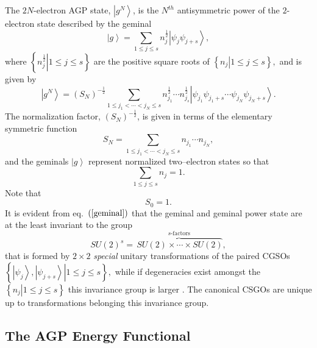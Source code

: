 \documentclass[aps,preprint]{revtex4}%
\begin{document}
\bigskip The $2N$-electron AGP state, $\left\vert g^{N}\right\rangle $, is the
$N^{th}$ antisymmetric power of the $2$-electron state described by the
geminal
\begin{equation}
\left\vert g\right\rangle =\sum_{1\leq j\leq s}n_{j}^{\frac{1}{2}}\left\vert
\psi_{j}\psi_{j+s}\right\rangle , \label{geminal}%
\end{equation}
where $\left\{  \left.  n_{j}^{\frac{1}{2}}\right\vert 1\leq j\leq s\right\}
$ are the positive square roots of $\left\{  \left.  n_{j}\right\vert 1\leq
j\leq s\right\}  ,$ and is given by \cite{Weiner&ortiz04}
\begin{equation}
\left\vert g^{N}\right\rangle =\left(  S_{N}\right)  ^{-\frac{1}{2}}%
\sum_{1\leq j_{1}<\cdots<j_{N}\leq s}n_{j_{1}}^{\frac{1}{2}}\cdots n_{j_{s}%
}^{\frac{1}{2}}\left\vert \psi_{j_{1}}\psi_{j_{1}+s}\cdots\psi_{j_{N}}%
\psi_{j_{N}+s}\right\rangle . \label{agp}%
\end{equation}
The normalization factor, $\left(  S_{N}\right)  ^{-\frac{1}{2}}$, is given in
terms of the elementary symmetric function
\begin{equation}
S_{N}=\sum_{1\leq j_{1}<\cdots<j_{N}\leq s}n_{j_{1}}\cdots n_{j_{N}},
\end{equation}
and the geminals $\left\vert g\right\rangle $ represent normalized
two--electron states so that
\begin{equation}
\sum_{1\leq j\leq s}n_{j}=1.
\end{equation}
Note that
\begin{equation}
S_{0}=1.
\end{equation}
It is evident from eq.\ $\left(  \ref{geminal}\right)  $ that the geminal and
geminal power state are at the least invariant to the group
\begin{equation}
SU\left(  2\right)  ^{s}=\overset{s\text{-factors}}{\overbrace{\,SU\left(
2\right)  \times\cdots\times SU\left(  2\right)  }},
\end{equation}
that is formed by $2\times2$ \emph{special} unitary transformations of the
paired CGSOs $\left\{  \left.  \left\vert \psi_{j}\right\rangle ,\left\vert
\psi_{j+s}\right\rangle \right\vert 1\leq j\leq s\right\}  ,$ while if
degeneracies exist amongst the $\left\{  \left.  n_{j}\right\vert 1\leq j\leq
s\right\}  $ this invariance group is larger \cite{AGPCoherent}. The canonical
CSGOs are unique up to transformations belonging this invariance group.

\subsection{The AGP Energy Functional}
\end{document}
